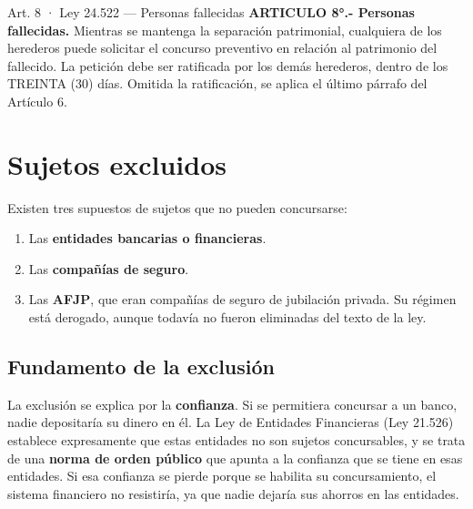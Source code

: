 \documentclass[12pt,oneside]{book}
\begin{document}
\begin{norma}{Art. 8 · Ley 24.522 — Personas fallecidas}
\textbf{ARTICULO 8°.- Personas fallecidas.} Mientras se mantenga la separación patrimonial, cualquiera de los herederos puede solicitar el concurso preventivo en relación al patrimonio del fallecido. La petición debe ser ratificada por los demás herederos, dentro de los TREINTA (30) días. Omitida la ratificación, se aplica el último párrafo del Artículo 6.
\end{norma}

\section{Sujetos excluidos}

Existen tres supuestos de sujetos que no pueden concursarse:

\begin{enumerate}
    \item Las \textbf{entidades bancarias o financieras}.
    \item Las \textbf{compañías de seguro}.
    \item Las \textbf{AFJP}, que eran compañías de seguro de jubilación privada. Su régimen está derogado, aunque todavía no fueron eliminadas del texto de la ley.
\end{enumerate}

\subsection{Fundamento de la exclusión}

La exclusión se explica por la \textbf{confianza}. Si se permitiera concursar a un banco, nadie depositaría su dinero en él. La Ley de Entidades Financieras (Ley 21.526) establece expresamente que estas entidades no son sujetos concursables, y se trata de una \textbf{norma de orden público} que apunta a la confianza que se tiene en esas entidades. Si esa confianza se pierde porque se habilita su concursamiento, el sistema financiero no resistiría, ya que nadie dejaría sus ahorros en las entidades.
\end{document}
